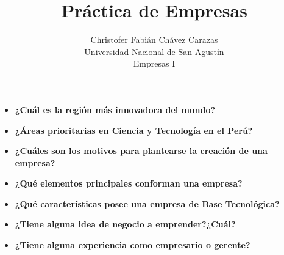 \documentclass[a4paper,12pt]{article}
\begin{document}
\title{Práctica de Empresas}
  \author{
  Christofer Fabián Chávez Carazas \\
  \small{Universidad Nacional de San Agustín} \\
  \small{Empresas I}
}

\maketitle


\begin{itemize}
 \item \textbf{¿Cuál es la región más innovadora del mundo?}
 
 
 \item \textbf{¿Áreas prioritarias en Ciencia y Tecnología en el Perú?}
 
 
 \item \textbf{¿Cuáles son los motivos para plantearse la creación de una empresa?}
 
 
 \item \textbf{¿Qué elementos principales conforman una empresa?}
 
 
 \item \textbf{¿Qué características posee una empresa de Base Tecnológica?}
 
 
 \item \textbf{¿Tiene alguna idea de negocio a emprender?¿Cuál?}
 
 
 \item \textbf{¿Tiene alguna experiencia como empresario o gerente?}
\end{itemize}
\end{document}

